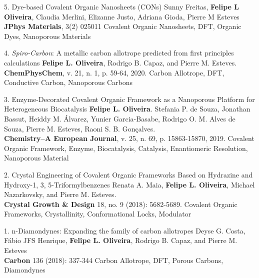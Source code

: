 \begin{projects}
	\project
	{5. Dye-based Covalent Organic Nanosheets (CONs)}{}
	{Sunny Freitas, \textbf{Felipe L Oliveira}, Claudia Merlini, Elizanne Justo, Adriana Gioda, Pierre M Esteves\\
	\textbf{JPhys Materials}, 3(2) 025011} 
    {}
	{Covalent Organic Nanosheets, DFT, Organic Dyes, Nanoporous Materials}
	
    \project
	{4. \textit{Spiro-Carbon}: A metallic carbon allotrope predicted from first principles calculations}{}
	{\textbf{Felipe L. Oliveira}, Rodrigo B. Capaz, and Pierre M. Esteves. \\
	\textbf{ChemPhysChem}, v. 21, n. 1, p. 59-64, 2020.}
	{}
	{Carbon Allotrope, DFT, Conductive Carbon, Nanoporous Carbons}
	
	\project
	{3. Enzyme-Decorated Covalent Organic Framework as a Nanoporous Platform for Heterogeneous Biocatalysis}{}
	{\textbf{Felipe L. Oliveira}. Stefania P. de Souza, Jonathan Bassut, Heiddy M. Álvarez, Yunier Garcia-Basabe, Rodrigo O. M. Alves de Souza, Pierre M. Esteves, Raoni S. B. Gonçalves. \\
	\textbf{Chemistry–A European Journal}, v. 25, n. 69, p. 15863-15870, 2019.}
	{}
	{Covalent Organic Framework, Enzyme, Biocatalysis, Catalysis, Enantiomeric Resolution, Nanoporous Material}
	
	\project
	{2. Crystal Engineering of Covalent Organic Frameworks Based on Hydrazine and Hydroxy-1, 3, 5-Triformylbenzenes}{}
	{Renata A. Maia, \textbf{Felipe L. Oliveira}, Michael Nazarkovsky, and Pierre M. Esteves. \\
	\textbf{Crystal Growth \& Design} 18, no. 9 (2018): 5682-5689.}
	{}
	{Covalent Organic Frameworks, Crystallinity, Conformational Locks, Modulator}

	\project
	{1. n-Diamondynes: Expanding the family of carbon allotropes}{}
	{Deyse G. Costa, Fábio JFS Henrique, \textbf{Felipe L. Oliveira}, Rodrigo B. Capaz, and Pierre M. Esteves \\
	\textbf{Carbon} 136 (2018): 337-344}
	{}
	{Carbon Allotrope, DFT, Porous Carbons, Diamondynes}
	
\end{projects}
